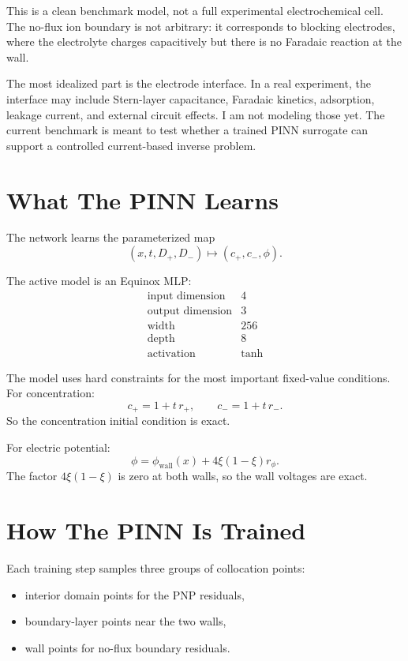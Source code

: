 \documentclass[11pt]{article}
\newcommand{\cp}{c_{+}}
\newcommand{\cn}{c_{-}}
\newcommand{\ph}{\phi}
\newcommand{\Dp}{D_{+}}
\newcommand{\Dn}{D_{-}}
\begin{document}
This is a clean benchmark model, not a full experimental electrochemical cell.
The no-flux ion boundary is not arbitrary: it corresponds to blocking
electrodes, where the electrolyte charges capacitively but there is no Faradaic
reaction at the wall.

The most idealized part is the electrode interface. In a real experiment, the
interface may include Stern-layer capacitance, Faradaic kinetics, adsorption,
leakage current, and external circuit effects. I am not modeling those yet. The
current benchmark is meant to test whether a trained PINN surrogate can support a
controlled current-based inverse problem.

\section*{What The PINN Learns}

The network learns the parameterized map
\[
  (x,t,\Dp,\Dn)\mapsto(\cp,\cn,\ph).
\]

The active model is an Equinox MLP:
\[
\begin{array}{ll}
\text{input dimension} & 4 \\
\text{output dimension} & 3 \\
\text{width} & 256 \\
\text{depth} & 8 \\
\text{activation} & \tanh
\end{array}
\]

The model uses hard constraints for the most important fixed-value conditions.
For concentration:
\[
  \cp = 1 + t\,r_+,\qquad \cn = 1 + t\,r_-.
\]
So the concentration initial condition is exact.

For electric potential:
\[
  \ph = \ph_{\mathrm{wall}}(x) + 4\xi(1-\xi)r_\ph.
\]
The factor $4\xi(1-\xi)$ is zero at both walls, so the wall voltages are exact.

\section*{How The PINN Is Trained}

Each training step samples three groups of collocation points:

\begin{itemize}
  \item interior domain points for the PNP residuals,
  \item boundary-layer points near the two walls,
  \item wall points for no-flux boundary residuals.
\end{itemize}
\end{document}
